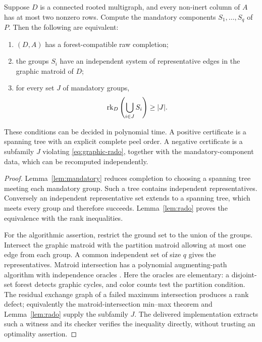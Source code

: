 \begin{theorem}
\label{thm:degree-two}
Suppose $D$ is a connected rooted multigraph, and every non-inert column
of $A$ has at most two nonzero rows.  Compute the mandatory components
$S_1,\ldots,S_q$ of $P$.  Then the following are equivalent:
\begin{enumerate}
\item $(D,A)$ has a forest-compatible raw completion;
\item the groups $S_i$ have an independent system of representative edges
  in the graphic matroid of $D$;
\item for every set $J$ of mandatory groups,
\begin{equation}\label{eq:graphic-rado}
             \operatorname{rk}_D\left(\bigcup_{i\in J}S_i\right)\geq |J|.
\end{equation}
\end{enumerate}
These conditions can be decided in polynomial time.  A positive certificate
is a spanning tree with an explicit complete peel order.  A negative
certificate is a subfamily $J$ violating \eqref{eq:graphic-rado}, together
with the mandatory-component data, which can be recomputed independently.
\end{theorem}
\begin{proof}
Lemma~\ref{lem:mandatory} reduces completion to choosing a spanning tree
meeting each mandatory group.  Such a tree contains independent
representatives.  Conversely an independent representative set extends
to a spanning tree, which meets every group and therefore succeeds.
Lemma~\ref{lem:rado} proves the equivalence with the rank inequalities.

For the algorithmic assertion, restrict the ground set to the union of
the groups.  Intersect the graphic matroid with the partition matroid
allowing at most one edge from each group.  A common independent set
of size $q$ gives the representatives.  Matroid intersection has a
polynomial augmenting-path algorithm with independence oracles
\cite{Edmonds1979}.  Here the oracles are elementary: a
disjoint-set forest detects graphic cycles, and color counts test the
partition condition.  The residual exchange graph of a failed maximum
intersection produces a rank defect; equivalently the matroid-intersection
min--max theorem and Lemma~\ref{lem:rado} supply the subfamily $J$.
The delivered implementation extracts such a witness and its checker
verifies the inequality directly, without trusting an optimality assertion.
\end{proof}

